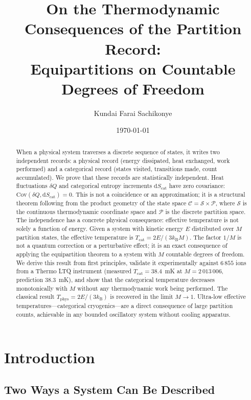 \documentclass[twocolumn,10pt]{article}
\title{On the Thermodynamic Consequences of the Partition Record:\\
Equipartitions on Countable Degrees of Freedom}
\author[1]{Kundai Farai Sachikonye}
\affil[1]{Technical University of Munich\\
\texttt{kundai.sachikonye@wzw.tum.de}}
\date{\today}
\newcommand{\kB}{k_{\mathrm{B}}}
\newcommand{\Tcat}{T_{\mathrm{cat}}}
\newcommand{\Tphys}{T_{\mathrm{phys}}}
\newcommand{\dQ}{\delta Q}
\newcommand{\dS}{\mathrm{d}S}
\newcommand{\Cov}{\mathrm{Cov}}
\begin{document}
\maketitle

\begin{abstract}
When a physical system traverses a discrete sequence of states, it writes two independent records: a physical record (energy dissipated, heat exchanged, work performed) and a categorical record (states visited, transitions made, count accumulated). We prove that these records are statistically independent. Heat fluctuations $\dQ$ and categorical entropy increments $\dS_{\mathrm{cat}}$ have zero covariance: $\Cov(\dQ, \dS_{\mathrm{cat}}) = 0$. This is not a coincidence or an approximation; it is a structural theorem following from the product geometry of the state space $\mathcal{C} = \mathcal{S} \times \mathcal{P}$, where $\mathcal{S}$ is the continuous thermodynamic coordinate space and $\mathcal{P}$ is the discrete partition space. The independence has a concrete physical consequence: effective temperature is not solely a function of energy. Given a system with kinetic energy $E$ distributed over $M$ partition states, the effective temperature is $\Tcat = 2E/(3\kB M)$. The factor $1/M$ is not a quantum correction or a perturbative effect; it is an exact consequence of applying the equipartition theorem to a system with $M$ countable degrees of freedom. We derive this result from first principles, validate it experimentally against $6\,855$ ions from a Thermo LTQ instrument (measured $\Tcat = 38.4$~mK at $M = 2\,013\,006$, prediction $38.3$~mK), and show that the categorical temperature decreases monotonically with $M$ without any thermodynamic work being performed. The classical result $\Tphys = 2E/(3\kB)$ is recovered in the limit $M \to 1$. Ultra-low effective temperatures---categorical cryogenics---are a direct consequence of large partition counts, achievable in any bounded oscillatory system without cooling apparatus.
\end{abstract}

\section{Introduction}
\label{sec:introduction}

\subsection{Two Ways a System Can Be Described}
\end{document}
